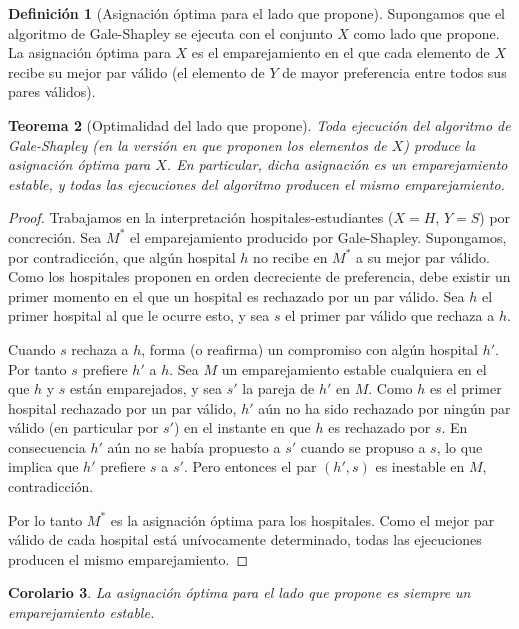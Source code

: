 \documentclass[12pt, spanish, oneside, openany]{book}
\theoremstyle{uprightplain}
\newtheorem{teorema}{Teorema}[section]
\newtheorem{corolario}[teorema]{Corolario}
\theoremstyle{definition}
\newtheorem{definicion}[teorema]{Definición}
\theoremstyle{remark}
\theoremstyle{definition}
\begin{document}
\begin{definicion}[Asignación óptima para el lado que propone]
Supongamos que el algoritmo de Gale-Shapley se ejecuta con el conjunto $X$ como lado que propone. La asignación óptima para $X$ es el emparejamiento en el que cada elemento de $X$ recibe su mejor par válido (el elemento de $Y$ de mayor preferencia entre todos sus pares válidos).
\end{definicion}

\begin{teorema}[Optimalidad del lado que propone]
\label{thm:opt-hospital}
Toda ejecución del algoritmo de Gale-Shapley (en la versión en que proponen los elementos de $X$) produce la asignación óptima para $X$. En particular, dicha asignación es un emparejamiento estable, y todas las ejecuciones del algoritmo producen el mismo emparejamiento.
\end{teorema}
\begin{proof}
Trabajamos en la interpretación hospitales-estudiantes ($X=H$, $Y=S$) por concreción. Sea $M^*$ el emparejamiento producido por Gale-Shapley. Supongamos, por contradicción, que algún hospital $h$ no recibe en $M^*$ a su mejor par válido. Como los hospitales proponen en orden decreciente de preferencia, debe existir un primer momento en el que un hospital es rechazado por un par válido. Sea $h$ el primer hospital al que le ocurre esto, y sea $s$ el primer par válido que rechaza a $h$.

Cuando $s$ rechaza a $h$, forma (o reafirma) un compromiso con algún hospital $h'$. Por tanto $s$ prefiere $h'$ a $h$. Sea $M$ un emparejamiento estable cualquiera en el que $h$ y $s$ están emparejados, y sea $s'$ la pareja de $h'$ en $M$. Como $h$ es el primer hospital rechazado por un par válido, $h'$ aún no ha sido rechazado por ningún par válido (en particular por $s'$) en el instante en que $h$ es rechazado por $s$. En consecuencia $h'$ aún no se había propuesto a $s'$ cuando se propuso a $s$, lo que implica que $h'$ prefiere $s$ a $s'$. Pero entonces el par $(h',s)$ es inestable en $M$, contradicción.

Por lo tanto $M^*$ es la asignación óptima para los hospitales. Como el mejor par válido de cada hospital está unívocamente determinado, todas las ejecuciones producen el mismo emparejamiento.
\end{proof}

\begin{corolario}
La asignación óptima para el lado que propone es siempre un emparejamiento estable.
\end{corolario}
\end{document}
